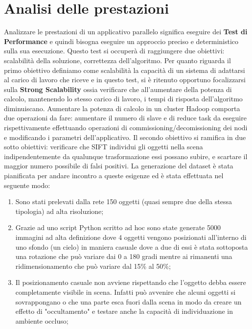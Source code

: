 \section{Analisi delle prestazioni}
Analizzare le prestazioni di un applicativo parallelo significa eseguire dei \textbf{Test di Performance} e quindi bisogna eseguire un approccio preciso e deterministico sulla sua esecuzione. Questo test si occuperà di raggiungere due obiettivi: scalabilità della soluzione, correttezza dell'algoritmo. Per quanto riguarda il primo obiettivo definiamo come scalabilità la capacità di un sistema di adattarsi al carico di lavoro che riceve e in questo test, si è ritenuto opportuno focalizzarsi sulla \textbf{Strong Scalability} ossia verificare che all'aumentare della potenza di calcolo, mantenendo lo stesso carico di lavoro, i tempi di risposta dell'algoritmo diminuiscano. Aumentare la potenza di calcolo in un cluster Hadoop comporta due operazioni da fare: aumentare il numero di slave e di reduce task da eseguire rispettivamente effettuando operazioni di commissioning/decomissioning dei nodi e modificando i parametri dell'applicativo. Il secondo obiettivo si ramifica in due sotto obiettivi: verificare che SIFT individui gli oggetti nella scena indipendentemente da qualunque trasformazione essi possano subire, e scartare il maggior numero possibile di falsi positivi. La generazione del dataset è stata pianificata per andare incontro a queste esigenze ed è stata effettuata nel seguente modo:
\begin{enumerate}
	\item Sono stati prelevati dalla rete 150 oggetti (quasi sempre due della stessa tipologia) ad alta risoluzione;
	\item Grazie ad uno script Python scritto ad hoc sono state generate 5000 immagini ad alta definizione dove 4 oggetti vengono posizionati all'interno di uno sfondo (un cielo) in maniera casuale dove a due di essi è stata sottoposta una rotazione che può variare dai 0 a 180 gradi mentre ai rimanenti una ridimensionamento che può variare dal 15\% al 50\%;
	\item Il posizionamento casuale non avviene rispettando che l'oggetto debba essere completamente visibile in scena. Infatti può avvenire che alcuni oggetti si sovrappongano o che una parte esca fuori dalla scena in modo da creare un effetto di "occultamento" e testare anche la capacità di individuazione in ambiente occluso;
\end{enumerate}
